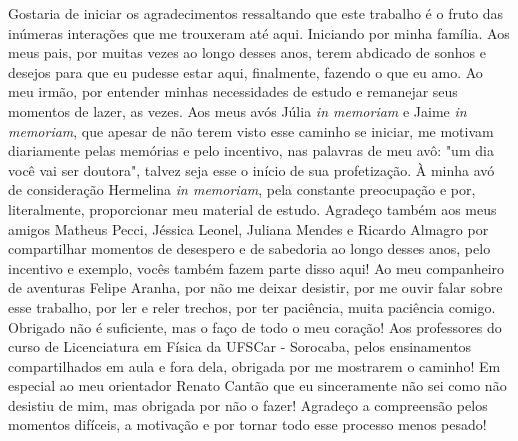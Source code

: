 

\begin{agradecimentos}
  Gostaria de iniciar os agradecimentos ressaltando que este trabalho é o fruto das inúmeras interações que me trouxeram até aqui.
  Iniciando por minha família. Aos meus pais, por muitas vezes ao longo desses anos, terem abdicado de sonhos e desejos para que eu pudesse estar aqui, finalmente, fazendo o que eu amo. Ao meu irmão, por entender minhas necessidades de estudo e remanejar seus momentos de lazer, as vezes. Aos meus avós Júlia {\textit{in memoriam}} e Jaime {\textit{in memoriam}}, que apesar de não terem visto esse caminho se iniciar, me motivam diariamente pelas memórias e pelo incentivo, nas palavras de meu avô: "um dia você vai ser doutora", talvez seja esse o início de sua profetização. À minha avó de consideração Hermelina {\textit{in memoriam}}, pela constante preocupação e por, literalmente, proporcionar meu material de estudo.
  Agradeço também aos meus amigos Matheus Pecci, Jéssica Leonel, Juliana Mendes e Ricardo Almagro por compartilhar momentos de desespero e de sabedoria ao longo desses anos, pelo incentivo e exemplo, vocês também fazem parte disso aqui!
  Ao meu companheiro de aventuras Felipe Aranha, por não me deixar desistir, por me ouvir falar sobre esse trabalho, por ler e reler trechos, por ter paciência, muita paciência comigo. Obrigado não é suficiente, mas o faço de todo o meu coração!
  Aos professores do curso de Licenciatura em Física da UFSCar - Sorocaba, pelos ensinamentos compartilhados em aula e fora dela, obrigada por me mostrarem o caminho! Em especial ao meu orientador Renato Cantão que eu sinceramente não sei como não desistiu de mim, mas obrigada por não o fazer! Agradeço a compreensão pelos momentos difíceis, a motivação e por tornar todo esse processo menos pesado!
  
\end{agradecimentos}

\cleardoublepage


